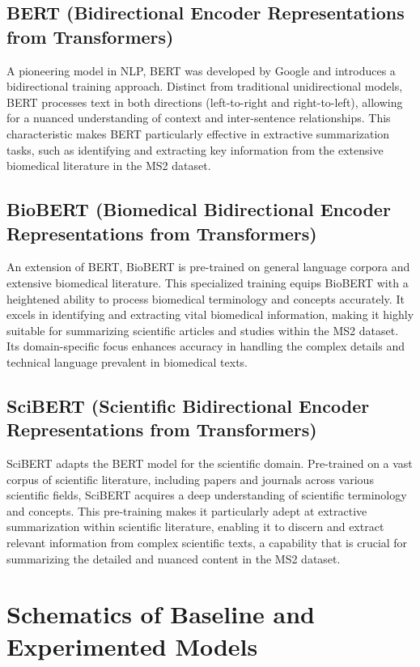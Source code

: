 \documentclass[11pt]{article}
\begin{document}
\subsection*{\textbf{BERT} (Bidirectional Encoder Representations from Transformers)}
A pioneering model in NLP, BERT was developed by Google and introduces a bidirectional training approach. Distinct from traditional unidirectional models, BERT processes text in both directions (left-to-right and right-to-left), allowing for a nuanced understanding of context and inter-sentence relationships. This characteristic makes BERT particularly effective in extractive summarization tasks, such as identifying and extracting key information from the extensive biomedical literature in the MS2 dataset.

\subsection*{\textbf{BioBERT} (Biomedical Bidirectional Encoder Representations from Transformers)}
An extension of BERT, BioBERT is pre-trained on general language corpora and extensive biomedical literature. This specialized training equips BioBERT with a heightened ability to process biomedical terminology and concepts accurately. It excels in identifying and extracting vital biomedical information, making it highly suitable for summarizing scientific articles and studies within the MS2 dataset. Its domain-specific focus enhances accuracy in handling the complex details and technical language prevalent in biomedical texts.

\subsection*{\textbf{SciBERT} (Scientific Bidirectional Encoder Representations from Transformers)}
SciBERT adapts the BERT model for the scientific domain. Pre-trained on a vast corpus of scientific literature, including papers and journals across various scientific fields, SciBERT acquires a deep understanding of scientific terminology and concepts. This pre-training makes it particularly adept at extractive summarization within scientific literature, enabling it to discern and extract relevant information from complex scientific texts, a capability that is crucial for summarizing the detailed and nuanced content in the MS2 dataset.

\bigskip
\section{Schematics of Baseline and Experimented Models}
\label{app:schematics}
\end{document}
